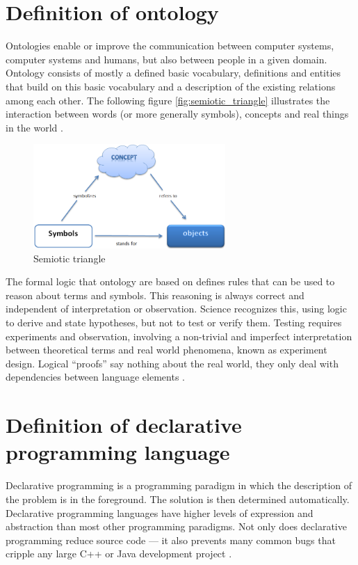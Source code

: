 \section{Definition of ontology}\label{sec:app:ontology}
\par
Ontologies enable or improve the communication between computer systems, computer systems and humans, but also between people in a given domain. Ontology consists of mostly a defined basic vocabulary, definitions and entities that build on this basic vocabulary and a description of the existing relations among each other. The following figure \vref{fig:semiotic_triangle} illustrates the interaction between words (or more generally symbols), concepts and real things in the world \autocite{appendix:ontology}.
\begin{figure}[htbp]
	\centering
	\includegraphics[width=0.65\textwidth]{pics/appendix/onto.png}
	\caption{Semiotic triangle \label{fig:semiotic_triangle}}	
\end{figure}
\par
The formal logic that ontology are based on defines rules that can be used to reason about terms and symbols. This reasoning is always correct and independent of interpretation or observation. Science recognizes this, using logic to derive and state hypotheses, but not to test or verify them. Testing requires experiments and observation, involving a non-trivial and imperfect interpretation between theoretical terms and real world phenomena, known as experiment design. Logical “proofs” say nothing about the real world, they only deal with dependencies between language elements \autocite{appendix:ontology}.

\section{Definition of declarative programming language}
\par
Declarative programming is a programming paradigm in which the description of the problem is in the foreground. The solution is then determined automatically. Declarative programming languages have higher levels of expression and abstraction than most other programming paradigms. Not only does declarative programming reduce source code — it also prevents many common bugs that cripple any large C++ or Java development project \autocite{appendix:hawkins}. 

